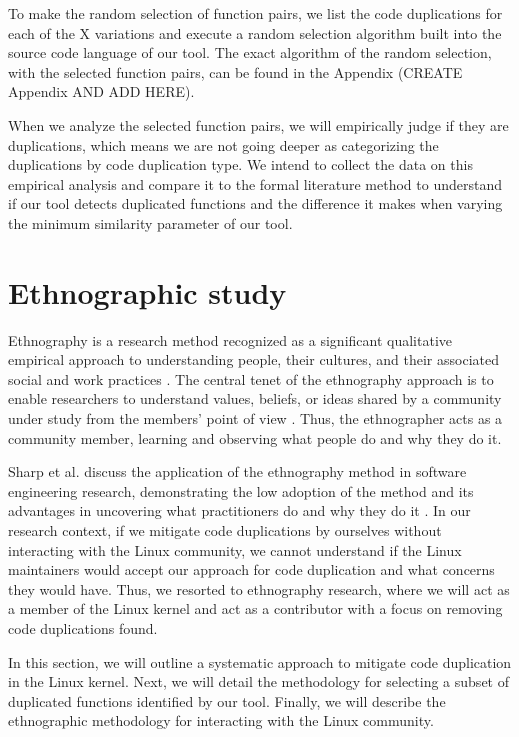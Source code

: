 To make the random selection of function pairs, we list the code duplications for each of the 
X variations and execute a random selection algorithm built into the source code language of 
our tool. The exact algorithm of the random selection, with the selected function pairs, can 
be found in the Appendix (CREATE Appendix AND ADD HERE).

When we analyze the selected function pairs, we will empirically judge if they are duplications,
which means we are not going deeper as categorizing the duplications by code duplication type. 
We intend to collect the data on this empirical analysis and compare it to the formal literature 
method to understand if our tool detects duplicated functions and the difference it makes when 
varying the minimum similarity parameter of our tool.

\section{Ethnographic study}

Ethnography is a research method recognized as a significant qualitative empirical approach to 
understanding people, their cultures, and their associated social and work practices \citep{bookethno}.
The central tenet of the ethnography approach is to enable researchers to understand values, 
beliefs, or ideas shared by a community under study from the members’ point of view 
\citep{ethnosoft}. Thus, the ethnographer acts as a community member, learning and observing 
what people do and why they do it.

Sharp et al. discuss the application of the ethnography method in software engineering research, 
demonstrating the low adoption of the method and its advantages in uncovering what practitioners 
do and why they do it \citep{ethnosoft}. In our research context, if we mitigate code 
duplications by ourselves without interacting with the Linux community, we cannot understand if 
the Linux maintainers would accept our approach for code duplication and what concerns they 
would have. Thus, we resorted to ethnography research, where we will act as a member of the 
Linux kernel and act as a contributor with a focus on removing code duplications found.

In this section, we will outline a systematic approach to mitigate code duplication in the 
Linux kernel. Next, we will detail the methodology for selecting a subset of duplicated functions 
identified by our tool. Finally, we will describe the ethnographic methodology for interacting 
with the Linux community.

